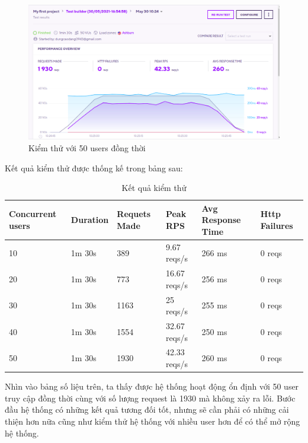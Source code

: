 		\begin{figure}[H]
			\includegraphics[width=1\textwidth]{Images/testing/testing_50.png}
			\centering
			\linebreak
			\caption{Kiểm thử với 50 users đồng thời}
		\end{figure}
		    Kết quả kiểm thử được thống kế trong bảng sau:
        \begin{center}
        \begin{table}[H]
        \begin{tabular}{|p{2cm}|p{2cm}|p{2cm}|p{2.5cm}|p{4cm}|p{2.5cm}|}
        \hline 
        Concurrent users & Duration & Requets Made & Peak RPS & Avg Response Time & Http Failures\\ 
        \hline 
        10 & 1m 30s & 389 & 9.67 reqs/s & 266 ms & 0 reqs\\ 
        \hline
        20 & 1m 30s & 773 &  16.67 reqs/s & 256 ms & 0 reqs\\
        \hline 
        30 & 1m 30s & 1163 & 25 reqs/s & 255 ms & 0 reqs\\
        \hline
        40 & 1m 30s & 1554 & 32.67 reqs/s & 250 ms & 0 reqs\\
        \hline
        50 & 1m 30s & 1930 & 42.33 reqs/s & 260 ms & 0 reqs\\
        \hline
        \end{tabular}
        \caption{Kết quả kiểm thử}
        \end{table}
        \end{center}
        Nhìn vào bảng số liệu trên, ta thấy được hệ thống hoạt động ổn định với 50 user truy cập đồng thời cùng với số lượng request là 1930 mà không xảy ra lỗi. Bước đầu hệ thống có những kết quả tương đối tốt, nhưng sẽ cần phải có những cải thiện hơn nữa cũng như kiểm thử  hệ thống với nhiều user hơn để có thể mở rộng hệ thống.
